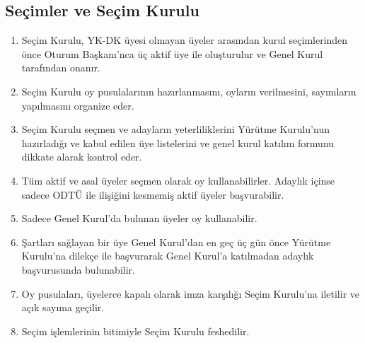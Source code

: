 \documentclass[11pt,a4paper]{article}
\begin{document}
\subsection{Seçimler ve Seçim Kurulu}
\begin{enumerate}
    \item Seçim Kurulu, YK-DK üyesi olmayan üyeler arasından kurul seçimlerinden önce Oturum Başkanı’nca üç aktif üye ile oluşturulur ve Genel Kurul tarafından onanır.
    \item Seçim Kurulu oy pusulalarının hazırlanmasını, oyların verilmesini, sayımların yapılmasını organize eder.
    \item Seçim Kurulu seçmen ve adayların yeterliliklerini Yürütme Kurulu’nun hazırladığı ve kabul edilen üye listelerini ve genel kurul katılım formunu dikkate alarak kontrol eder.
    \item Tüm aktif ve asal üyeler seçmen olarak oy kullanabilirler. Adaylık içinse sadece ODTÜ ile ilişiğini kesmemiş aktif üyeler başvurabilir.
    \item Sadece Genel Kurul’da bulunan üyeler oy kullanabilir.
    \item Şartları sağlayan bir üye Genel Kurul’dan en geç üç gün önce Yürütme Kurulu’na dilekçe ile başvurarak Genel Kurul’a katılmadan adaylık başvurusunda bulunabilir.
    \item Oy pusulaları, üyelerce kapalı olarak imza karşılığı Seçim Kurulu’na iletilir ve açık sayıma geçilir.
    \item Seçim işlemlerinin bitimiyle Seçim Kurulu feshedilir.
\end{enumerate}
\end{document}
